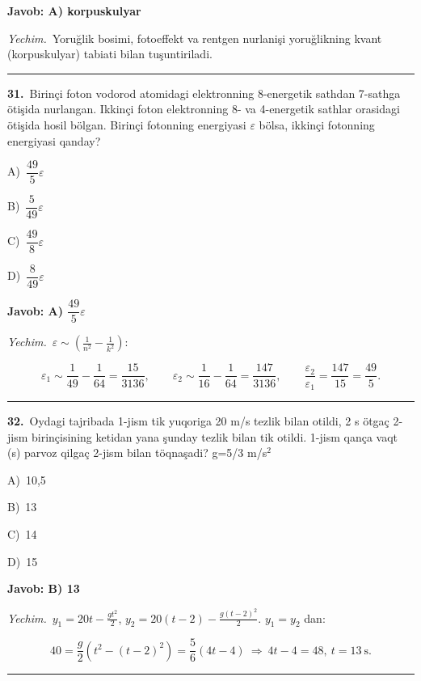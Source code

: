 \documentclass[11pt,a4paper]{article}
\newcommand{\opt}[2]{\hspace*{4mm}#1)\ #2\par}
\begin{document}
\noindent\colorbox{gray!12}{\parbox{\dimexpr\linewidth-2\fboxsep}{\textbf{Javob: A) korpuskulyar}}}\par\smallskip
\noindent\textit{Yechim.}\ Yoruğlik bosimi, fotoeffekt va rentgen nurlanişi yoruğlikning kvant (korpuskulyar) tabiati bilan tuşuntiriladi.\par\par\medskip\hrule\medskip
{}\noindent\begin{minipage}{\linewidth}
\textbf{31.}\ Birinçi foton vodorod atomidagi elektronning 8-energetik sathdan 7-sathga ötişida nurlangan. Ikkinçi foton elektronning 8- va 4-energetik sathlar orasidagi ötişida hosil bölgan. Birinçi fotonning energiyasi $\varepsilon$ bölsa, ikkinçi fotonning energiyasi qanday?\par\smallskip
\opt{A}{$\dfrac{49}{5}\varepsilon$}
\opt{B}{$\dfrac{5}{49}\varepsilon$}
\opt{C}{$\dfrac{49}{8}\varepsilon$}
\opt{D}{$\dfrac{8}{49}\varepsilon$}
\end{minipage}\vspace{2pt}\par
\noindent\colorbox{gray!12}{\parbox{\dimexpr\linewidth-2\fboxsep}{\textbf{Javob: A) $\dfrac{49}{5}\varepsilon$}}}\par\smallskip
\noindent\textit{Yechim.}\ $\varepsilon\sim\left(\frac{1}{n^2}-\frac{1}{k^2}\right)$:\par
\[\varepsilon_1\sim\frac1{49}-\frac1{64}=\frac{15}{3136},\qquad \varepsilon_2\sim\frac1{16}-\frac1{64}=\frac{147}{3136},\qquad \frac{\varepsilon_2}{\varepsilon_1}=\frac{147}{15}=\frac{49}{5}.\]\par\medskip\hrule\medskip
{}\noindent\begin{minipage}{\linewidth}
\textbf{32.}\ Oydagi tajribada 1-jism tik yuqoriga 20 m/s tezlik bilan otildi, 2 s ötgaç 2-jism birinçisining ketidan yana şunday tezlik bilan tik otildi. 1-jism qança vaqt (s) parvoz qilgaç 2-jism bilan töqnaşadi? g=5/3 m/s$^{2}$\par\smallskip
\opt{A}{10,5}
\opt{B}{13}
\opt{C}{14}
\opt{D}{15}
\end{minipage}\vspace{2pt}\par
\noindent\colorbox{gray!12}{\parbox{\dimexpr\linewidth-2\fboxsep}{\textbf{Javob: B) 13}}}\par\smallskip
\noindent\textit{Yechim.}\ $y_1=20t-\frac{g t^2}{2}$, $y_2=20(t-2)-\frac{g(t-2)^2}{2}$. $y_1=y_2$ dan:\par
\[40=\frac{g}{2}\left(t^2-(t-2)^2\right)=\frac{5}{6}(4t-4)\ \Rightarrow\ 4t-4=48,\ t=13\ \text{s}.\]\par\medskip\hrule\medskip
\end{document}
